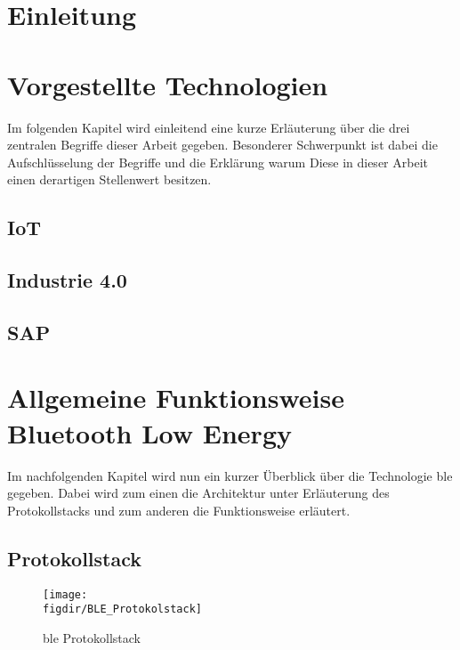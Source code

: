 \section{Einleitung}
\label{s:intro}

\section{Vorgestellte Technologien}
\label{s:grundlagen}

Im folgenden Kapitel wird einleitend eine kurze Erläuterung über die drei zentralen Begriffe dieser Arbeit gegeben. Besonderer Schwerpunkt ist dabei die Aufschlüsselung der Begriffe und die Erklärung warum Diese in dieser Arbeit einen derartigen Stellenwert besitzen.\\ 

\subsection{IoT}
\label{ss:grundlagen:beispiele}


\subsection{Industrie 4.0}
\label{ss:grundlagen:hardware}


\subsection{SAP}
\label{ss:grundlagen:frequenz}


\section{Allgemeine Funktionsweise Bluetooth Low Energy}
\label{s:funktionsweise}

\noindent Im nachfolgenden Kapitel wird nun ein kurzer Überblick über die Technologie \ac{ble} gegeben. Dabei wird zum einen die Architektur unter Erläuterung des Protokollstacks und zum anderen die Funktionsweise erläutert.\\   

\subsection{Protokollstack}
\label{ss:funktionsweise:protokollstack}

\begin{figure}[h]
	\centering
	\texttt{[image: \\figdir/BLE\_Protokolstack]}
	\caption{\ac{ble} Protokollstack \cite[Seite 16]{Townsend14:GSB}}
	\label{FIG:protokollstack}
\end{figure}

